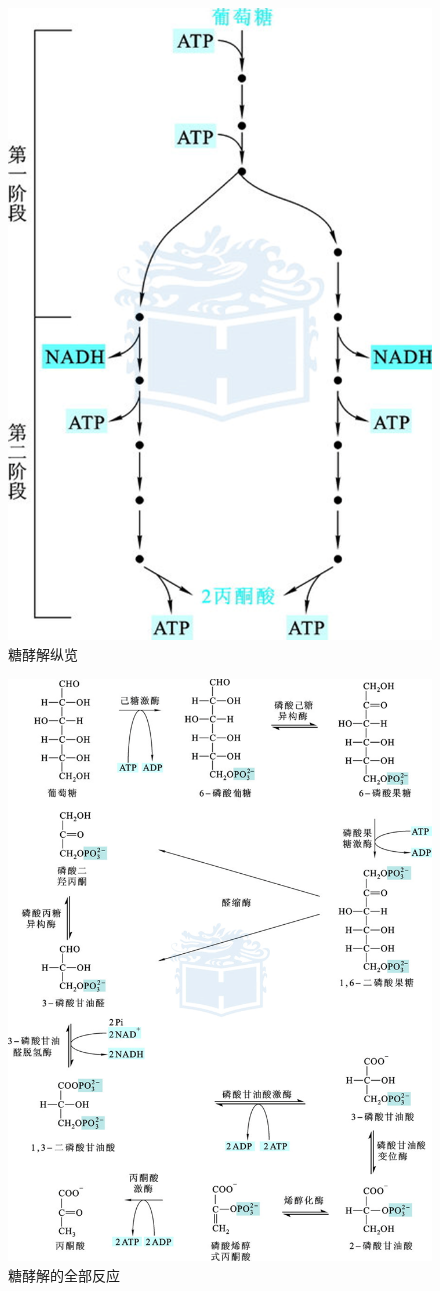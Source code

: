 \begin{figure}[htbp]
	\centering
	\includegraphics[width=0.4\linewidth]{Pics/糖酵解纵览}
	\caption{糖酵解纵览}
	\label{fig:糖酵解纵览}
\end{figure}

\begin{figure}[p]
	\centering
	\includegraphics[width=\linewidth]{Pics/糖酵解的全部发硬}
	\caption{糖酵解的全部反应}
	\label{fig:all_reaction_glycolysis}
\end{figure}

